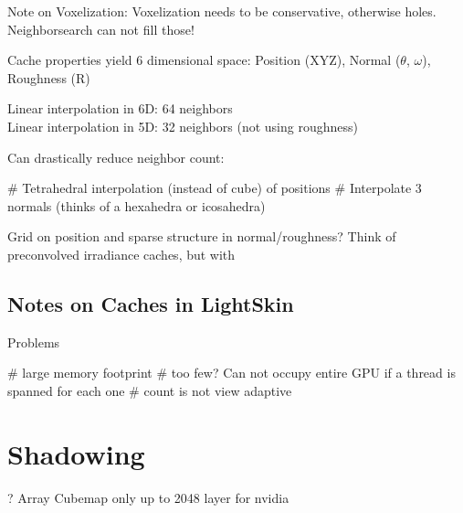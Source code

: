 \documentclass[thesis.tex]{subfiles}
\begin{document}
Note on Voxelization: Voxelization needs to be conservative, otherwise holes. Neighborsearch can not fill those!



Cache properties yield 6 dimensional space: Position (XYZ), Normal ($\theta$, $\omega$), Roughness (R)

Linear interpolation in 6D: 64 neighbors\\
Linear interpolation in 5D: 32 neighbors (not using roughness)

Can drastically reduce neighbor count:
\begin{easylist}
# Tetrahedral interpolation (instead of cube) of positions
# Interpolate 3 normals (thinks of a hexahedra or icosahedra)
\end{easylist}

Grid on position and sparse structure in normal/roughness? Think of preconvolved irradiance caches, but with 

\subsection{Notes on Caches in LightSkin}

Problems
\begin{easylist}[itemize]
# large memory footprint
# too few? Can not occupy entire GPU if a thread is spanned for each one
# count is not view adaptive
\end{easylist}


\section{Shadowing}

?
Array Cubemap only up to 2048 layer for nvidia
\end{document}
